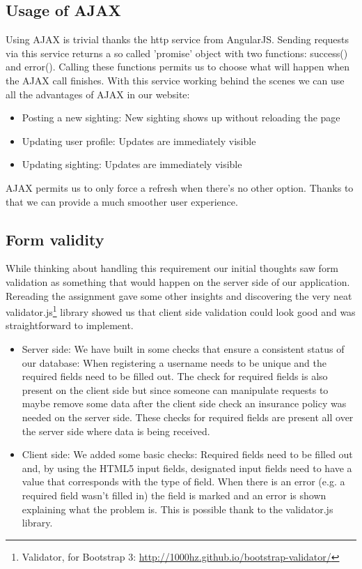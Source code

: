 \documentclass{article}
\begin{document}
\subsection{Usage of AJAX}
Using AJAX is trivial thanks the http service from AngularJS. Sending requests via this service returns a so called 'promise' object with two functions: success() and error(). Calling these functions permits us to choose what will happen when the AJAX call finishes.
With this service working behind the scenes we can use all the advantages of AJAX in our website:
\begin{itemize}
\item Posting a new sighting: New sighting shows up without reloading the page
\item Updating user profile: Updates are immediately visible
\item Updating sighting: Updates are immediately visible
\end{itemize}
AJAX permits us to only force a refresh when there's no other option. Thanks to that we can provide a much smoother user experience.

\subsection{Form validity}
While thinking about handling this requirement our initial thoughts saw form validation as something that would happen on the server side of our application. Rereading the assignment gave some other insights and discovering the very neat validator.js\footnote{ Validator, for Bootstrap 3: \url{http://1000hz.github.io/bootstrap-validator/} } library showed us that client side validation could look good and was straightforward to implement.
\begin{itemize}
	\item Server side: We have built in some checks that ensure a consistent status of our database: When registering a username needs to be unique and the required fields need to be filled out. The check for required fields is also present on the client side but since someone can manipulate requests to maybe remove some data after the client side check an insurance policy was needed on the server side. These checks for required fields are present all over the server side where data is being received.
	\item Client side: We added some basic checks: Required fields need to be filled out and, by using the HTML5 input fields, designated input fields need to have a value that corresponds with the type of field. When there is an error (e.g. a required field wasn't filled in) the field is marked and an error is shown explaining what the problem is. This is possible thank to the validator.js library.
\end{itemize}
\end{document}
